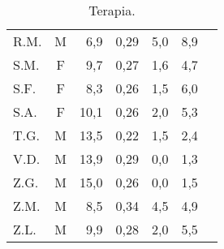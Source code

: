 \begin{table}[!h]
\begin{center}
\begin{tabular}{lcrcccl}
R.M.	& M & 6,9   	      &  0,29     	& 5,0                 & 8,9  \\
S.M.	& F & 9,7   	      &  0,27     	& 1,6              & 4,7  \\
S.F.	& F & 8,3   	      &  0,26     	& 1,5              & 6,0  \\
S.A.	& F & 10,1  	      &  0,26     	& 2,0                 & 5,3  \\
T.G.    & M & 13,5            &  0,22       & 1,5              & 2,4  \\
V.D.	& M & 13,9  	      &  0,29     	& 0,0                 & 1,3  \\
Z.G.	& M & 15,0  	      &  0,26     	& 0,0                & 1,5  \\
Z.M.	& M & 8,5   	      &  0,34     	& 4,5                & 4,9  \\
Z.L.	& M & 9,9   	      &  0,28     	& 2,0             & 5,5  \\
\bottomrule
\end{tabular}
\end{center}
\caption{Terapia.}
\label{tab:Terapia}
\end{table}


